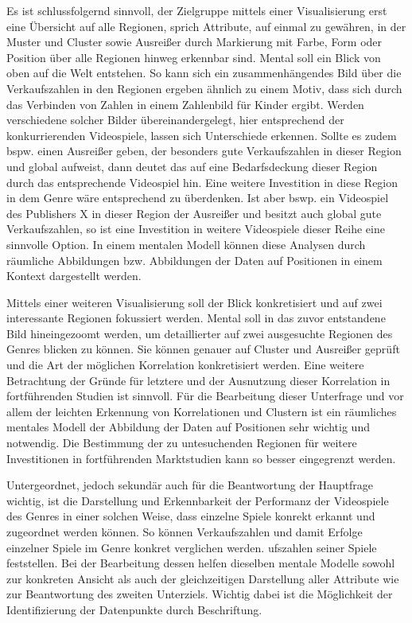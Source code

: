 \documentclass[usegeometry=true]{scrartcl}
\begin{document}
Es ist schlussfolgernd sinnvoll, der Zielgruppe mittels einer Visualisierung erst eine Übersicht auf alle Regionen, sprich Attribute, auf einmal zu gewähren, in der Muster und Cluster sowie Ausreißer durch Markierung mit Farbe, Form oder Position über alle Regionen hinweg erkennbar sind. 
Mental soll ein Blick von oben auf die Welt entstehen. 
So kann sich ein zusammenhängendes Bild über die Verkaufszahlen in den Regionen ergeben ähnlich zu einem Motiv, dass sich durch das Verbinden von Zahlen in einem Zahlenbild für Kinder ergibt.
Werden verschiedene solcher Bilder übereinandergelegt, hier entsprechend der konkurrierenden Videospiele, lassen sich Unterschiede erkennen.
Sollte es zudem bspw. einen Ausreißer geben, der besonders gute Verkaufszahlen in dieser Region und global aufweist, dann deutet das auf eine Bedarfsdeckung dieser Region durch das entsprechende Videospiel hin. 
Eine weitere Investition in diese Region in dem Genre wäre entsprechend zu überdenken. 
Ist aber bswp. ein Videospiel des Publishers X in dieser Region der Ausreißer und besitzt auch global gute Verkaufszahlen, so ist eine Investition in weitere Videospiele dieser Reihe eine sinnvolle Option.
In einem mentalen Modell können diese Analysen durch räumliche Abbildungen bzw. Abbildungen der Daten auf Positionen in einem Kontext dargestellt werden.

Mittels einer weiteren Visualisierung soll der Blick konkretisiert und auf zwei interessante Regionen fokussiert werden. 
Mental soll in das zuvor entstandene Bild hineingezoomt werden, um detaillierter auf zwei ausgesuchte Regionen des Genres blicken zu können.
Sie können genauer auf Cluster und Ausreißer geprüft und die Art der möglichen Korrelation konkretisiert werden.
Eine weitere Betrachtung der Gründe für letztere und der Ausnutzung dieser Korrelation in fortführenden Studien ist sinnvoll. 
Für die Bearbeitung dieser Unterfrage und vor allem der leichten Erkennung von Korrelationen und Clustern ist ein räumliches mentales Modell der Abbildung der Daten auf Positionen sehr wichtig und notwendig.
Die Bestimmung der zu untesuchenden Regionen für weitere Investitionen in fortführenden Marktstudien kann so besser eingegrenzt werden.

Untergeordnet, jedoch sekundär auch für die Beantwortung der Hauptfrage wichtig, ist die Darstellung und Erkennbarkeit der Performanz der Videospiele des Genres in einer solchen Weise, dass einzelne Spiele konrekt erkannt und zugeordnet werden können.
So können Verkaufszahlen und damit Erfolge einzelner Spiele im Genre konkret verglichen werden. 
ufszahlen seiner Spiele feststellen.  
Bei der Bearbeitung dessen helfen dieselben mentale Modelle sowohl zur konkreten Ansicht als auch der gleichzeitigen Darstellung aller Attribute wie zur Beantwortung des zweiten Unterziels. 
Wichtig dabei ist die Möglichkeit der Identifizierung der Datenpunkte durch Beschriftung.
\end{document}
